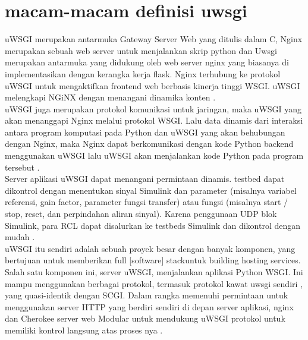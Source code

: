 \documentclass[12pt, times new roman, a4paper]{Article}
\begin{document}

\section{macam-macam definisi uwsgi}
 	uWSGI merupakan antarmuka Gateway Server Web yang ditulis dalam C, Nginx merupakan sebuah web server untuk menjalankan skrip python dan Uwsgi merupakan antarmuka yang didukung oleh web server nginx yang biasanya di implementasikan dengan kerangka kerja flask. Nginx terhubung ke protokol uWSGI untuk mengaktifkan frontend web berbasis kinerja tinggi WSGI. uWSGI melengkapi NGiNX dengan menangani dinamika konten \cite{balaji2013sentinel}.\\
	
	uWSGI juga merupakan protokol komunikasi untuk jaringan, maka uWSGI yang akan menanggapi Nginx melalui protokol WSGI. Lalu data dinamis dari interaksi antara program komputasi pada Python dan uWSGI yang akan behubungan dengan Nginx, maka Nginx dapat berkomunikasi dengan kode Python backend menggunakan uWSGI lalu uWSGI akan menjalankan kode Python pada program tersebut \cite{hirschbergreal}.\\
	
	Server aplikasi uWSGI dapat menangani permintaan dinamis. testbed dapat dikontrol dengan menentukan sinyal Simulink dan parameter (misalnya variabel referensi, gain factor, parameter fungsi transfer) atau fungsi (misalnya start / stop, reset, dan perpindahan aliran sinyal). Karena penggunaan UDP blok Simulink, para RCL dapat disalurkan ke testbeds Simulink dan dikontrol dengan mudah \cite{zumsandedesign}.\\
	
	uWSGI itu sendiri adalah sebuah proyek besar dengan banyak komponen, yang bertujuan untuk memberikan full [software] stackuntuk building hosting services. Salah satu komponen ini, server uWSGI, menjalankan aplikasi Python WSGI. Ini mampu menggunakan berbagai protokol, termasuk protokol kawat uwsgi sendiri , yang quasi-identik dengan SCGI. Dalam rangka memenuhi permintaan untuk menggunakan server HTTP yang berdiri sendiri di depan server aplikasi, nginx dan Cherokee server web Modular untuk mendukung uWSGI protokol untuk memiliki kontrol langsung atas proses nya \cite{dong2015chemdes}.\\
\end{document}
